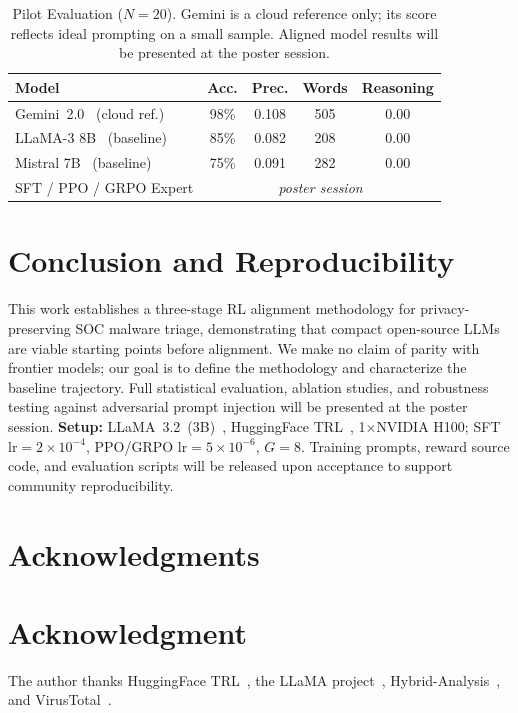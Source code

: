\documentclass[conference,compsoc]{IEEEtran}
\begin{document}
\begin{table}[!t]
  \renewcommand{\arraystretch}{1.15}
  \caption{Pilot Evaluation ($N{=}20$). Gemini is a cloud reference only;
           its score reflects ideal prompting on a small sample.
           Aligned model results will be presented at the poster session.}
  \label{tab:results}
  \centering
  \begin{tabular}{lcccc}
    \toprule
    \textbf{Model} & \textbf{Acc.} & \textbf{Prec.} &
    \textbf{Words} & \textbf{Reasoning} \\
    \midrule
    Gemini~2.0~\cite{gemini} (cloud ref.) & 98\% & 0.108 & 505 & 0.00 \\
    LLaMA-3 8B~\cite{llama3} (baseline)   & 85\% & 0.082 & 208 & 0.00 \\
    Mistral 7B~\cite{mistral} (baseline)  & 75\% & 0.091 & 282 & 0.00 \\
    \midrule
    SFT / PPO / GRPO Expert & \multicolumn{4}{c}{\emph{poster session}} \\
    \bottomrule
  \end{tabular}
\end{table}

\section{Conclusion and Reproducibility}

This work establishes a three-stage RL alignment methodology for
privacy-preserving SOC malware triage, demonstrating that compact
open-source LLMs are viable starting points before alignment.
We make no claim of parity with frontier models; our goal is to define
the methodology and characterize the baseline trajectory.
Full statistical evaluation, ablation studies, and robustness testing
against adversarial prompt injection will be presented at the poster session.
\textbf{Setup:} LLaMA~3.2~(3B)~\cite{llama3}, HuggingFace
TRL~\cite{trl}, 1$\times$NVIDIA H100; SFT $\text{lr}{=}2{\times}10^{-4}$,
PPO/GRPO $\text{lr}{=}5{\times}10^{-6}$, $G{=}8$.
Training prompts, reward source code, and evaluation scripts will be
released upon acceptance to support community reproducibility.

\ifCLASSOPTIONcompsoc
  \section*{Acknowledgments}
\else
  \section*{Acknowledgment}
\fi
The author thanks HuggingFace TRL~\cite{trl}, the LLaMA
project~\cite{llama3}, Hybrid-Analysis~\cite{hybridanalysis}, and
VirusTotal~\cite{virustotal}.
\end{document}
